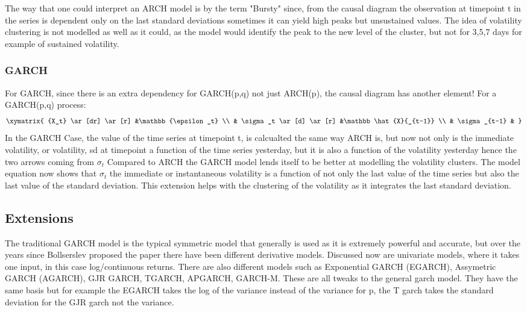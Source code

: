 The way that one could interpret an ARCH model is by the term "Bursty" since, from the causal diagram the observation at timepoint t in the series is dependent only on the last standard deviations sometimes it can yield high peaks but unsustained values. The idea of volatility clustering is not modelled as well as it could, as the model would identify the peak to the new level of the cluster, but not for 3,5,7 days for example of sustained volatility. 
\subsubsection{GARCH}
For GARCH, since there is an extra dependency for GARCH(p,q) not just ARCH(p), the causal diagram has another element!
For a GARCH(p,q) process: 
$$
\xymatrix{
{X_t} \ar[dr] \ar[r] &\mathbb{\epsilon_t} \\
 & \sigma_t \ar[d] \ar[r] &\mathbb\hat{X}{_{t-1}} \\
  & \sigma_{t-1} & 
  }
$$
In the GARCH Case, the value of the time series at timepoint t, is calcualted the same way ARCH is, but now not only is the immediate volatility, or volatility, sd at timepoint a function of the time series yesterday, but it is also a function of the volatility yesterday hence the two arrows coming from $\sigma_t$
\cite{GARCHYoutube}
Compared to ARCH the GARCH model lends itself to be better at modelling the volatility clusters. The model equation now shows that $\sigma_t$ the immediate or instantaneous volatility is a function of not only the last value of the time series but also the last value of the standard deviation. This extension helps with the clustering of the volatility as it integrates the last standard deviation. 
\subsection{Extensions}
The traditional GARCH model is the typical symmetric model that generally is used as it is extremely powerful and accurate, but over the years since Bollserslev proposed the paper there have been different derivative models. Discussed now are univariate models, where it takes one input, in this case log/continuous returns. There are also different models such as Exponential GARCH (EGARCH), Assymetric GARCH (AGARCH), GJR GARCH, TGARCH, APGARCH, GARCH-M. These are all tweaks to the general garch model. They have the same basis but for example the EGARCH takes the log of the variance instead of the variance for p, the T garch takes the standard deviation for the GJR garch not the variance. \cite{GARCHMODels}

